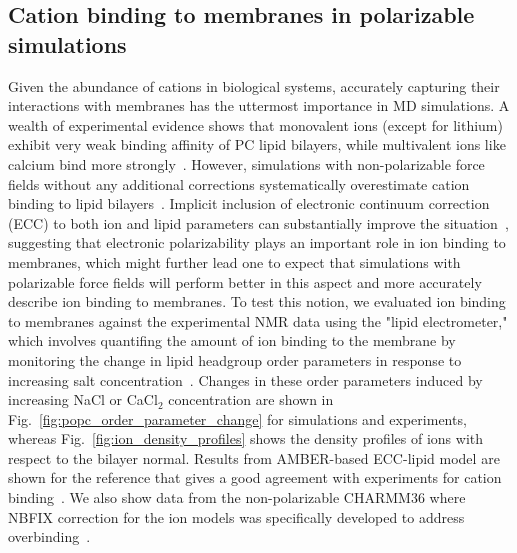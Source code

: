 \documentclass[journal=jacsat,manuscript=article,layout=singlecolumn]{achemso}
\begin{document}
\subsection{Cation binding to membranes in polarizable simulations}

Given the abundance of cations in biological systems, accurately capturing their interactions with membranes has the uttermost importance in MD simulations. A wealth of  experimental evidence shows that monovalent ions (except for lithium) exhibit very weak binding affinity of PC lipid bilayers, while multivalent ions like calcium bind more strongly~\cite{Catte2016}. However, simulations with non-polarizable force fields without any additional corrections systematically overestimate cation binding to lipid bilayers~\cite{Catte2016}. Implicit inclusion of electronic continuum correction (ECC) to both ion and lipid parameters can substantially improve the situation~\cite{Melcr:2018a,melcr2019improved,bacle21}, suggesting that electronic polarizability plays an important role in ion binding to membranes, which might further lead one to expect that simulations with polarizable force fields will perform better in this aspect and more accurately describe ion binding to membranes.
To test this notion, we evaluated ion binding to membranes against the experimental NMR data using the "lipid electrometer," which involves quantifing the amount of ion binding to the membrane by monitoring the change in lipid headgroup order parameters in response to increasing salt concentration~\cite{Catte2016}. Changes in these order parameters induced by increasing NaCl or CaCl$_2$ concentration are shown in Fig.~\ref{fig:popc_order_parameter_change} for simulations and experiments, whereas Fig.~\ref{fig:ion_density_profiles} shows the density profiles of ions with respect to the bilayer normal. Results from AMBER-based ECC-lipid model are shown for the reference that gives a good agreement with experiments for cation binding~\cite{Melcr:2018a}. We also show data from the non-polarizable CHARMM36 where NBFIX correction for the ion models was specifically developed to address overbinding~\cite{Venable2013,Han2018}.
\end{document}
